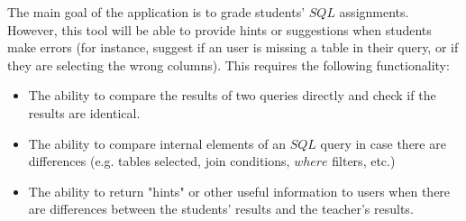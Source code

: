 The main goal of the application is to grade students' $SQL$ assignments.
However, this tool will be able to provide hints or suggestions when students
make errors (for instance, suggest if an user is missing a table in their
query, or if they are selecting the wrong columns). This requires the
following functionality:
\begin{itemize}
    \item The ability to compare the results of two queries directly and check if the results are identical.
    \item The ability to compare internal elements of an $SQL$ query in case there are differences (e.g. tables selected, join conditions, $where$ filters, etc.)
    \item The ability to return "hints" or other useful information to users when there are differences between the students' results and the teacher's results.
\end{itemize}
